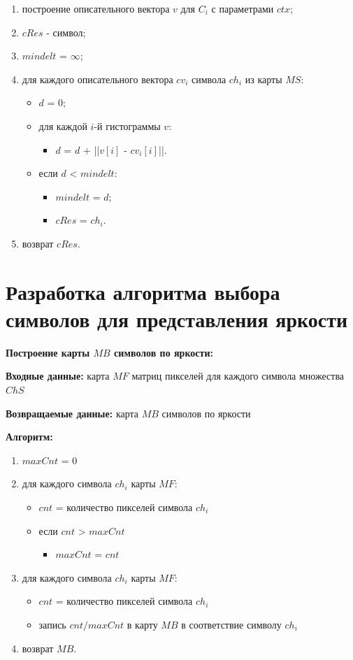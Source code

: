 \begin{enumerate}
    \item построение описательного вектора $v$ для $C_i$ с параметрами $ctx$;
    \item $cRes$ - символ;
    \item $mindelt$ = $\infty$;
    \item для каждого описательного вектора $cv_i$ символа $ch_i$ из карты $MS$:
    \begin{itemize}
        \item $d$ = 0;
        \item для каждой $i$-й гистограммы $v$:
        \begin{itemize}
            \item $d$ = $d$ + ||$v[i]$ - $cv_i[i]$||.
        \end{itemize}
        \item если $d$ < $mindelt$:
        \begin{itemize}
            \item $mindelt$ = $d$;
            \item $cRes$ = $ch_i$.
        \end{itemize}
    \end{itemize}
    \item возврат $cRes$.
\end{enumerate}

\section{Разработка алгоритма выбора символов для представления яркости}

\textbf{Построение карты $MB$ символов по яркости:}

\textbf{Входные данные:} карта $MF$ матриц пикселей для каждого символа множества $ChS$

\textbf{Возвращаемые данные:} карта $MB$ символов по яркости

\textbf{Алгоритм:}

\begin{enumerate}
    \item $maxCnt$ = 0
    \item для каждого символа $ch_i$ карты $MF$:
    \begin{itemize}
        \item $cnt$ = количество пикселей символа $ch_i$
        \item если $cnt$ > $maxCnt$
        \begin{itemize}
            \item $maxCnt$ = $cnt$
        \end{itemize}
    \end{itemize}
    \item для каждого символа $ch_i$ карты $MF$:
    \begin{itemize}
        \item $cnt$ = количество пикселей символа $ch_i$
        \item запись $cnt / maxCnt$ в карту $MB$ в соответствие символу $ch_i$
    \end{itemize}
    \item возврат $MB$.
\end{enumerate}

